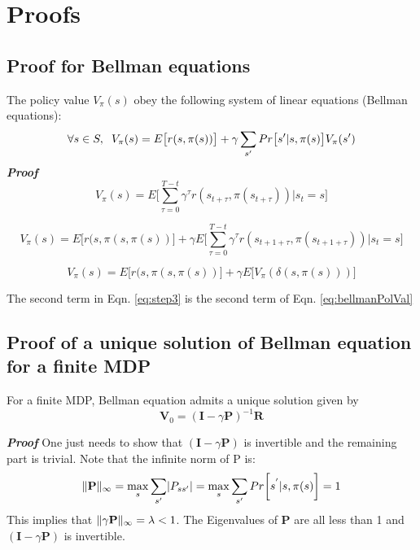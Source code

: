 \documentclass[conference]{IEEEtran}
\DeclarePairedDelimiter{\abs}{\lvert}{\rvert}
\DeclarePairedDelimiter{\norm}{\lVert}{\rVert}
\begin{document}
\appendices
\section{Proofs}
\subsection{Proof for Bellman equations}
The policy value  $V_{\pi}(s)$ obey the following system of linear equations (Bellman equations):
\begin{equation} \label{eq:bellmanPolVal}
\forall s \in S,\hspace{0.2cm} V_{\pi}(s) = E\big[r(s,\pi(s))\big] + \gamma \sum_{s'} Pr\big[s'|s,\pi(s)\big] V_{\pi}(s')
\end{equation} 
\textit{\textbf{Proof}}
\begin{equation} \label{eq:step1}
V_{\pi}(s) =  E\bigg[\sum_{\tau=0}^{T-t} \gamma^\tau r(s_{t+\tau}, \pi(s_{t+\tau})) | s_{t} = s  \bigg] 
\end{equation}

\begin{equation} \label{eq:step2}
V_{\pi}(s) = E\big[r(s, \pi(s, \pi(s)) \big] + \gamma  E\bigg[\sum_{\tau=0}^{T-t} \gamma^\tau r(s_{t+1+\tau}, \pi(s_{t+1+\tau})) | s_{t} = s \bigg]
\end{equation}

\begin{equation} \label{eq:step3}
V_{\pi}(s) = E\big[r(s, \pi(s, \pi(s))\big] + \gamma  E\big[ V_{\pi}(\delta(s,\pi(s))) \big]
\end{equation}

The second term in Eqn. \ref{eq:step3} is the second term of Eqn. \ref{eq:bellmanPolVal}

\subsection{Proof of a unique solution of Bellman equation for a finite MDP}
For a finite MDP, Bellman equation admits a unique solution given by
\begin{equation} \label{eq:bellmanSolUnique}
\textbf{V}_{0} = (\textbf{I}-\gamma \textbf{P})^{-1} \textbf{R} 
\end{equation}

\textit{\textbf{Proof}} One just needs to show that $(\textbf{I}-\gamma \textbf{P})$ is invertible and the remaining part is trivial. Note that the infinite norm of P is:
\begin{equation} \label{eq:infiniteNorm}
\norm{\textbf{P}}_{\infty} = \max\limits_{s}  \sum \limits_{s'} \abs{P_{ss'}} = \max\limits_{s} \sum \limits_{s'} Pr\bigg[s^{'}|s,\pi(s) \bigg] = 1 
\end{equation}
This implies that $\norm{\gamma \textbf{P}}_{\infty} = 	\lambda < 1$. The Eigenvalues of $\textbf{P}$ are all less than 1 and $(\textbf{I}-\gamma \textbf{P})$ is invertible.
\end{document}
